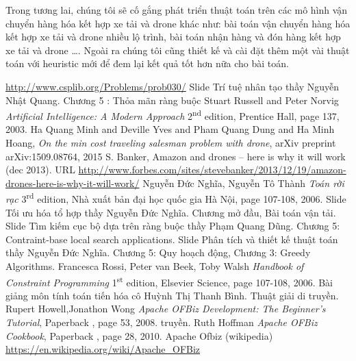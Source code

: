 \documentclass[a4paper,12pt]{report}
\begin{document}
Trong tương lai, chúng tôi sẽ cố gắng phát triển thuật toán trên các mô hình vận chuyển hàng hóa kết hợp xe tải và drone khác như: bài toán vận chuyển hàng hóa kết hợp xe tải và drone nhiều lộ trình, bài toán nhận hàng và đón hàng kết hợp xe tải và drone \ldots. Ngoài ra chúng tôi cũng thiết kế và cài đặt thêm một vài thuật toán với heuristic mới để đem lại kết quả tốt hơn nữa cho bài toán.

\begin{thebibliography}{9}
 \url{http://www.csplib.org/Problems/prob030/}
 Slide Trí tuệ nhân tạo thầy Nguyễn Nhật Quang. Chương 5 : Thỏa mãn ràng buộc
 Stuart Russell and Peter Norvig 
\textit{Artificial Intelligence: A Modern Approach} 2\textsuperscript{nd } edition, Prentice Hall, page 137,  2003.
 Ha Quang Minh and Deville Yves and Pham Quang Dung and Ha Minh Hoang, \textit{On the min cost traveling salesman problem with drone}, arXiv preprint arXiv:1509.08764, 2015
 S. Banker, Amazon and drones – here is why it will work (dec 2013).
URL \url{http://www.forbes.com/sites/stevebanker/2013/12/19/amazon-drones-here-is-why-it-will-work/}
 Nguyễn Đức Nghĩa, Nguyễn Tô Thành 
\textit{Toán rời rạc} 3\textsuperscript{rd} edition, Nhà xuất bản đại học quốc gia Hà Nội, page 107-108,  2006.
 Slide Tối ưu hóa tổ hợp thầy Nguyễn Đức Nghĩa. Chương mở đầu, Bài toán vận tải.
 Slide Tìm kiếm cục bộ dựa trên ràng buộc thầy Phạm Quang Dũng. Chương 5: Contraint-base local search applications.
 Slide Phân tích và thiết kế thuật toán thầy Nguyễn Đức Nghĩa. Chương 5: Quy hoạch động, Chương 3: Greedy Algorithms.
 Francesca Rossi, Peter van Beek, Toby Walsh 
\textit{Handbook of Constraint Programming} 1\textsuperscript{st} edition, Elsevier Science, page 107-108,  2006.
 Bài giảng môn tính toán tiến hóa cô Huỳnh Thị Thanh Bình. Thuật giải di truyền.
Rupert Howell,Jonathon Wong
\textit{Apache OFBiz Development: The Beginner's Tutorial}, Paperback , page 53,  2008.
truyền.
 Ruth Hoffman
\textit{Apache OFBiz Cookbook}, Paperback , page 28, 2010.
 Apache Ofbiz (wikipedia)
\url{https://en.wikipedia.org/wiki/Apache_OFBiz}
\end{thebibliography}
\end{document}
